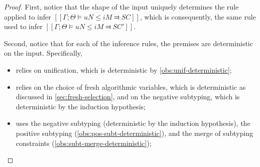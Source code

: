 \obsNegSubtDeterministic*
\begin{proof}
    First, notice that the shape of
    the input uniquely determines the rule applied to infer
    $[[Γ ; Θ ⊨ uN ≤ iM ⫤ SC]]$,
    which is consequently, the same rule used to
    infer $[[Γ ; Θ ⊨ uN ≤ iM ⫤ SC']]$.

    Second, notice that for each of the inference rules, 
    the premises are deterministic on the input.
    Specifically, 
    \begin{itemize}
        \item {} relies on unification,
            which is deterministic by \cref{obs:unif-deterministic};
        \item {} relies on
            the choice of fresh algorithmic variables,
            which is deterministic as discussed in \cref{sec:fresh-selection},
            and on the negative subtyping, which is deterministic by
            the induction hypothesis;
        \item {} uses 
            the negative subtyping 
            (deterministic by the induction hypothesis),
            the positive subtyping 
            (\cref{obs:pos-subt-deterministic}),
            and the merge of subtyping constraints
            (\cref{obs:subt-merge-deterministic});
    \end{itemize}
\end{proof}


